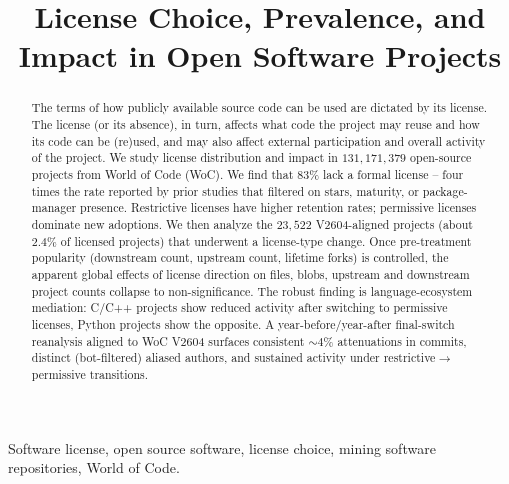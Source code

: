 \documentclass[10pt,conference]{IEEEtran}
\begin{document}
\title{License Choice, Prevalence, and Impact in Open Software Projects}

\author{
\and
{}
\and
{}
}

\maketitle

\begin{abstract}
The terms of how publicly available source code can be used are dictated
by its license. The license (or its absence), in turn, affects what code
the project may reuse and how its code can be (re)used, and may also
affect external participation and overall activity of the project. We
study license distribution and impact in $131{,}171{,}379$ open-source
projects from World of Code (WoC). We find that $83\%$ lack a formal
license -- four times the rate reported by prior studies that filtered
on stars, maturity, or package-manager presence. Restrictive licenses
have higher retention rates; permissive licenses dominate new adoptions.
We then analyze the $23{,}522$ V2604-aligned projects (about $2.4\%$ of
licensed projects) that underwent a license-type change. Once
pre-treatment popularity (downstream count, upstream count, lifetime
forks) is controlled, the apparent global effects of license direction on
files, blobs, upstream and downstream project counts collapse to
non-significance. The robust finding is language-ecosystem mediation:
C/C++ projects show reduced activity after switching to permissive
licenses, Python projects show the opposite. A year-before/year-after
final-switch reanalysis aligned to WoC V2604 surfaces consistent $\sim
4\%$ attenuations in commits, distinct (bot-filtered) aliased authors,
and sustained activity under restrictive$\rightarrow$permissive
transitions.
\end{abstract}

\begin{IEEEkeywords}
Software license, open source software, license choice, mining software repositories, World of Code.
\end{IEEEkeywords}
\end{document}
